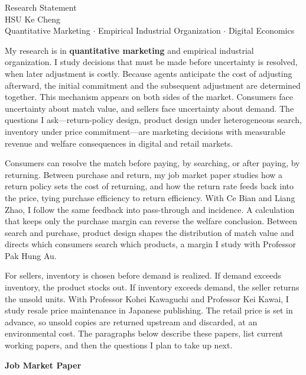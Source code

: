 \documentclass[11pt]{article}
\begin{document}
\begin{center}
{\Large Research Statement}\\[0.3em]
HSU Ke Cheng \\[0.2em]
{\small Quantitative Marketing $\cdot$ Empirical Industrial Organization $\cdot$ Digital Economics}
\end{center}

My research is in \textbf{quantitative marketing} and empirical industrial organization. I study decisions that must be made before uncertainty is resolved, when later adjustment is costly. Because agents anticipate the cost of adjusting afterward, the initial commitment and the subsequent adjustment are determined together. This mechanism appears on both sides of the market. Consumers face uncertainty about match value, and sellers face uncertainty about demand. The questions I ask---return-policy design, product design under heterogeneous search, inventory under price commitment---are marketing decisions with measurable revenue and welfare consequences in digital and retail markets.

Consumers can resolve the match before paying, by searching, or after paying, by returning. Between purchase and return, my job market paper studies how a return policy sets the cost of returning, and how the return rate feeds back into the price, tying purchase efficiency to return efficiency. With Ce Bian and Liang Zhao, I follow the same feedback into pass-through and incidence. A calculation that keeps only the purchase margin can reverse the welfare conclusion. Between search and purchase, product design shapes the distribution of match value and directs which consumers search which products, a margin I study with Professor Pak Hung Au.

For sellers, inventory is chosen before demand is realized. If demand exceeds inventory, the product stocks out. If inventory exceeds demand, the seller returns the unsold units. With Professor Kohei Kawaguchi and Professor Kei Kawai, I study resale price maintenance in Japanese publishing. The retail price is set in advance, so unsold copies are returned upstream and discarded, at an environmental cost. The paragraphs below describe these papers, list current working papers, and then the questions I plan to take up next.

\textbf{Job Market Paper}
\end{document}
